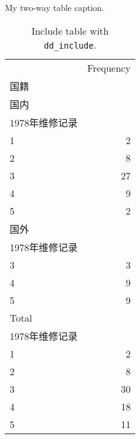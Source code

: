 \documentclass{ctexart}
\begin{document}
\begin{table}[H]
\centering
\caption{My two-way table caption.}
\begin{tabular}{ll}
\cline{1-2}
\multicolumn{1}{c}{} &
  \multicolumn{1}{|r}{Frequency} \\
\cline{1-2}
\multicolumn{1}{l}{国籍} &
  \multicolumn{1}{|r}{} \\
\multicolumn{1}{l}{\hspace{1em}国内} &
  \multicolumn{1}{|r}{} \\
\multicolumn{1}{l}{\hspace{2em}1978年维修记录} &
  \multicolumn{1}{|r}{} \\
\multicolumn{1}{l}{\hspace{3em}1} &
  \multicolumn{1}{|r}{2} \\
\multicolumn{1}{l}{\hspace{3em}2} &
  \multicolumn{1}{|r}{8} \\
\multicolumn{1}{l}{\hspace{3em}3} &
  \multicolumn{1}{|r}{27} \\
\multicolumn{1}{l}{\hspace{3em}4} &
  \multicolumn{1}{|r}{9} \\
\multicolumn{1}{l}{\hspace{3em}5} &
  \multicolumn{1}{|r}{2} \\
\multicolumn{1}{l}{\hspace{1em}国外} &
  \multicolumn{1}{|r}{} \\
\multicolumn{1}{l}{\hspace{2em}1978年维修记录} &
  \multicolumn{1}{|r}{} \\
\multicolumn{1}{l}{\hspace{3em}3} &
  \multicolumn{1}{|r}{3} \\
\multicolumn{1}{l}{\hspace{3em}4} &
  \multicolumn{1}{|r}{9} \\
\multicolumn{1}{l}{\hspace{3em}5} &
  \multicolumn{1}{|r}{9} \\
\multicolumn{1}{l}{\hspace{1em}Total} &
  \multicolumn{1}{|r}{} \\
\multicolumn{1}{l}{\hspace{2em}1978年维修记录} &
  \multicolumn{1}{|r}{} \\
\multicolumn{1}{l}{\hspace{3em}1} &
  \multicolumn{1}{|r}{2} \\
\multicolumn{1}{l}{\hspace{3em}2} &
  \multicolumn{1}{|r}{8} \\
\multicolumn{1}{l}{\hspace{3em}3} &
  \multicolumn{1}{|r}{30} \\
\multicolumn{1}{l}{\hspace{3em}4} &
  \multicolumn{1}{|r}{18} \\
\multicolumn{1}{l}{\hspace{3em}5} &
  \multicolumn{1}{|r}{11} \\
\cline{1-2}
\end{tabular}
\caption{Include table with \texttt{dd\_include}.}
\end{table}
\end{document}
